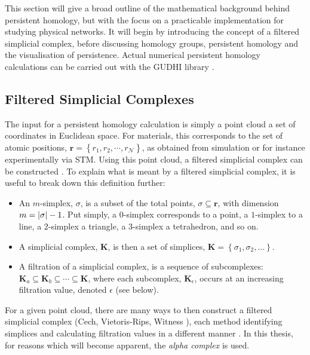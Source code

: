 This section will give a broad outline of the mathematical background behind persistent homology, but with the focus on a practicable implementation for studying physical \td{} networks.
It will begin by introducing the concept of a filtered simplicial complex, before discussing homology groups, persistent homology and the visualisation of persistence.
Actual numerical persistent homology calculations can be carried out with the GUDHI library \cite{gudhi}.

\subsection{Filtered Simplicial Complexes}

The input for a persistent homology calculation is simply a point cloud \ie{} a set of coordinates in Euclidean space.
For materials, this corresponds to the set of atomic positions, $\mathbf{r}=\left\{r_1,r_2,\cdots,r_\mathcal{N}\right\}$, as obtained from simulation or for instance experimentally via STM.
Using this point cloud, a filtered simplicial complex can be constructed \cite{Fugacci2016}.
To explain what is meant by a filtered simplicial complex, it is useful to break down this definition further:
\begin{itemize}
	\item An $m$\--simplex, $\sigma$, is a subset of the total points, $\sigma\subseteq\mathbf{r}$, with dimension $m=\lvert\sigma\rvert-1$.
Put simply, a $0$\--simplex corresponds to a point, a $1$\--simplex to a line, a $2$\--simplex a triangle, a $3$\--simplex a tetrahedron, and so on.%
	\item A simplicial complex, $\mathbf{K}$, is then a set of simplices, $\mathbf{K}=\left\{\sigma_1,\sigma_2,\dots\right\}$.
	\item A filtration of a simplicial complex, is a sequence of subcomplexes: $\mathbf{K}_a \subseteq \mathbf{K}_b \subseteq \cdots \subseteq \mathbf{K}$, where each subcomplex, $\mathbf{K}_\epsilon$, occurs at an increasing filtration value, denoted $\epsilon$ (see below).
\end{itemize}
For a given point cloud, there are many ways to then construct a filtered simplicial complex (Cech, Vietoris\--Rips, Witness \etc), each method identifying simplices and calculating filtration values in a different manner  \cite{Otter2017}.
In this thesis, for reasons which will become apparent, the \textit{alpha complex} is used.

